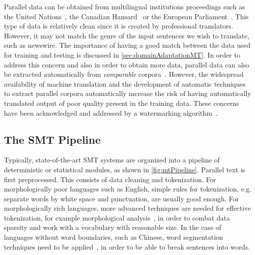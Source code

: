 Parallel data can be obtained from multilingual institutions
proceedings such as the United
Nations~\citep{franz-kumar-brants:2013:LDC},%
the Canadian
Hansard~\citep{germann:2001:WEB} or the
European Parliament~\citep{koehn:2005:MTSummit}.
This type of data is relatively clean since it is created
by professional translators. However, it may not match
the genre of the input sentences we wish to translate, such
as newswire. The importance of having a good match between
the data used for training and testing is discussed
in \autoref{sec:domainAdaptationMT}. In order to address
this concern and also in order to obtain more data, parallel
data can also be extracted automatically from \emph{comparable}
corpora~\citep{smith-saintamand-plamada-koehn-callisonburch-lopez:2013:ACL2013}.
However, the widespread availability of
machine translation and the development of automatic techniques
to extract parallel corpora automatically increase the
risk of having automatically translated output of poor
quality present in the training data. These concerns have
been acknowledged and addressed by a watermarking
algorithm~\citep{venugopal-uszkoreit-talbot-och-ganitkevitch:2011:EMNLP}.

\subsection{The SMT Pipeline}
\label{sec:theSMTpipeline}

Typically, state-of-the-art SMT systems are organized into
a pipeline of deterministic or statistical modules, as shown
in \autoref{fig:mtPipeline}.
Parallel text is first preprocessed. This consists of data cleaning
and tokenization.
For morphologically poor languages such as
English, simple rules for tokenization, e.g. separate words by white space
and punctuation, are usually good enough.
For morphologically rich languages, more advanced techniques
are needed for effective tokenization, for example
morphological analysis~\citep{habash-rambow:2005:ACL}, in order
to combat data sparsity and work with a vocabulary with reasonable size.
In the case of languages without word
boundaries, such as Chinese, word segmentation techniques
need to be applied~\citep{zhang-clark:2007:ACL}, in order
to be able to break sentences into words.

